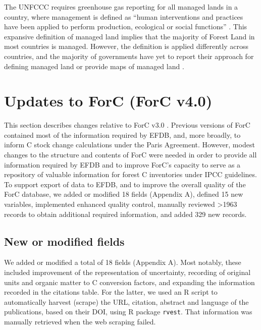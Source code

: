 \documentclass[, manuscript]{copernicus}
\begin{document}
The UNFCCC requires greenhouse gas reporting for all managed lands in a
country, where management is defined as ``human interventions and
practices have been applied to perform production, ecological or social
functions'' \citep{ipcc_2006_2006}. This expansive definition of managed
land implies that the majority of Forest Land in most countries is
managed. However, the definition is applied differently across
countries, and the majority of governments have yet to report their
approach for defining managed land or provide maps of managed land
\citep{ogle_delineating_2018, deng_comparing_2021}.

\section{Updates to ForC (ForC v4.0)}

This section describes changes relative to ForC v3.0
\citep{anderson-teixeira_carbon_2021}. Previous versions of ForC
\citep{anderson-teixeira_carbon_2016, anderson-teixeira_forc_2018, anderson-teixeira_carbon_2021}
contained most of the information required by EFDB, and, more broadly,
to inform C stock change calculations under the Paris Agreement.
However, modest changes to the structure and contents of ForC were
needed in order to provide all information required by EFDB and to
improve ForC's capacity to serve as a repository of valuable information
for forest C inventories under IPCC guidelines. To support export of
data to EFDB, and to improve the overall quality of the ForC database,
we added or modified 18 fields (Appendix A), defined 15 new variables,
implemented enhanced quality control, manually reviewed \textgreater1963
records to obtain additional required information, and added 329 new
records.

\subsection{New or modified fields}

We added or modified a total of 18 fields (Appendix A). Most notably,
these included improvement of the representation of uncertainty,
recording of original units and organic matter to C conversion factors,
and expanding the information recorded in the citations table. For the
latter, we used an R script to automatically harvest (scrape) the URL,
citation, abstract and language of the publications, based on their DOI,
using R package \texttt{rvest}\citep{wickham_rvest_2022}. That
information was manually retrieved when the web scraping failed.
\end{document}
